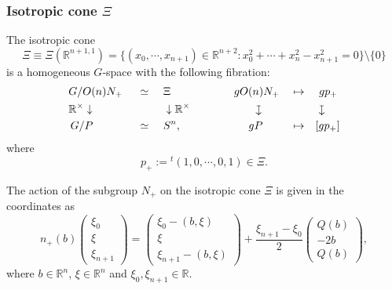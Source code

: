 \subsubsection{Isotropic cone $\Xi$}
\label{subsec:Xicone}
The isotropic cone
\[
     \Xi\equiv \Xi({\mathbb{R}}^{n+1,1})=
     \{(x_0, \cdots, x_{n+1}) \in {\mathbb{R}}^{n+2}:
        x_0^2+ \cdots + x_{n}^2 - x_{n+1}^2=0\}
     \setminus
     \{0\}    
\]
 is a homogeneous $G$-space 
 with the following fibration: 
\begin{alignat*}{6}
   &G/O(n) N_+ \,\,&& \simeq\,\,  && \Xi
   && \qquad\quad g O(n)N_+ && \mapsto && \ g p_+
\\
&  {\mathbb{R}}^{\times}\downarrow && && \downarrow {\mathbb{R}}^{\times}
   && \qquad\quad\qquad \rotatebox[origin=c]{-90}{$\mapsto$}  && && \  \rotatebox[origin=c]{-90}{$\mapsto$}
\\
     &\,G/P && \simeq \,\, && S^n,
     &&
     \qquad\quad\quad\,\,  gP &&\mapsto &&  [g p_+]
\end{alignat*}
where 
\begin{equation}
\label{eqn:p+}
p_+ :={} {}^{t\!} (1, 0, \cdots, 0, 1) \in \Xi. 
\end{equation}



The action of the subgroup $N_+$ on the isotropic cone
 $\Xi$ is given in the coordinates as 
\begin{equation}
\label{eqn:nbxi}
  n_+(b) \begin{pmatrix} \xi_0 \\ \xi \\ \xi_{n+1} \end{pmatrix}
 =
\begin{pmatrix}
 \xi_0 -(b,\xi)
\\
 \xi 
\\ 
 \xi_{n+1}-(b,\xi)
\end{pmatrix}
+
\frac{\xi_{n+1} -\xi_0}{2}
\begin{pmatrix} Q(b)\\ -2 b\\ Q(b)\end{pmatrix}, 
\end{equation}
where
 $b \in {\mathbb{R}}^n$, 
 $\xi \in {\mathbb{R}}^n$ and $\xi_0, \xi_{n+1}\in\mathbb{R}$.  



